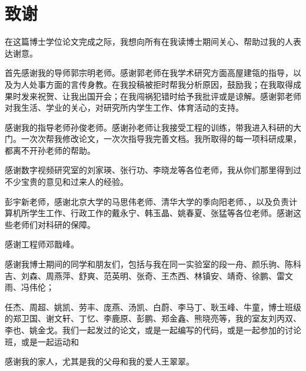\chapter{致谢}

在这篇博士学位论文完成之际，我想向所有在我读博士期间关心、帮助过我的人表达谢意。

首先感谢我的导师郭宗明老师。感谢郭老师在我学术研究方面高屋建瓴的指导，以及为人处事方面的言传身教。在我投稿被拒时帮我分析原因，鼓励我；在我取得成果时发来祝贺、让我出国开会；在我闯祸犯错时给予我批评或是谅解。感谢郭老师对我生活、学业的关心，对研究所内学生工作、体育活动的支持。

感谢我的指导老师孙俊老师。感谢孙老师让我接受工程的训练，带我进入科研的大门。一次次帮我修改论文，一次次指导我完善文档。我所取得的每一项科研成果，都离不开孙老师的帮助。

感谢数字视频研究室的刘家瑛、张行功、李晓龙等各位老师，我从你们那里得到过不少宝贵的意见和过来人的经验。

彭宇新老师，感谢北京大学的马思伟老师、清华大学的季向阳老师、，以及负责计算机所学生工作、行政工作的戴永宁、韩玉晶、姚春夏、张猛等各位老师。感谢这些老师们对科研的保障。

感谢工程师邓戬峰。

感谢我博士期间的同学和朋友们，包括与我在同一实验室的段一舟、颜乐驹、陈科吉、刘森、周燕萍、舒爽、范英明、张奇、王杰西、林镇安、靖奇、徐鹏、雷文雨、冯伟伦；

任杰、周超、姚凯、劳丰、庞燕、汤凯、白蔚、李马丁、耿玉峰、牛童，博士班级的郑卫国、谢文轩、丁忆、李鹿原、彭鹏、郑金鑫、熊晓亮等，我的室友刘丙双、李也、姚金戈。我们一起发过的论文，或是一起编写的代码，或是一起参加的讨论班，或是一起运动和

感谢我的家人，尤其是我的父母和我的爱人王翠翠。